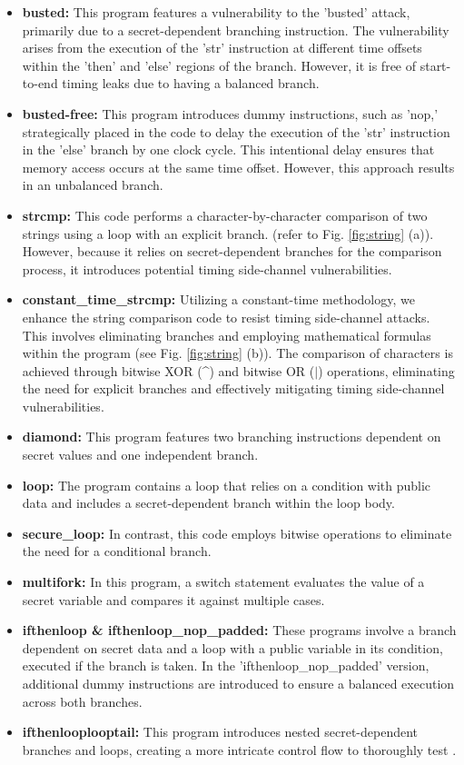 \begin{itemize}
%
    \item \textbf{busted:} This program features a vulnerability to the 'busted' attack, primarily due to a secret-dependent branching instruction. The vulnerability arises from the execution of the 'str' instruction at different time offsets within the 'then' and 'else' regions of the branch. However, it is free of start-to-end timing leaks due to having a balanced branch.
%
    \item \textbf{busted-free:} This program introduces dummy instructions, such as 'nop,' strategically placed in the code to delay the execution of the 'str' instruction in the 'else' branch by one clock cycle. This intentional delay ensures that memory access occurs at the same time offset. However, this approach results in an unbalanced branch.
%
    \item \textbf{strcmp:} This code performs a character-by-character comparison of two strings using a loop with an explicit branch. (refer to Fig. \ref{fig:string} (a)). However, because it relies on secret-dependent branches for the comparison process, it introduces potential timing side-channel vulnerabilities.
%
    \item \textbf{ constant\_time\_strcmp:} Utilizing a constant-time methodology, we enhance the string comparison code to resist timing side-channel attacks. This involves eliminating branches and employing mathematical formulas within the program (see Fig. \ref{fig:string} (b)). The comparison of characters is achieved through bitwise XOR (\textasciicircum) and bitwise OR ($|$) operations, eliminating the need for explicit branches and effectively mitigating timing side-channel vulnerabilities.
%
    \item \textbf{diamond:} This program features two branching instructions dependent on secret values and one independent branch.
%
    \item \textbf{loop:} The program contains a loop that relies on a condition with public data and includes a secret-dependent branch within the loop body. 
%    
    \item \textbf{secure\_loop:} In contrast, this code employs bitwise operations to eliminate the need for a conditional branch.
%    
    \item \textbf{multifork:} In this program, a switch statement evaluates the value of a secret variable and compares it against multiple cases. 
    
    \item \textbf{ifthenloop \& ifthenloop\_nop\_padded:} These programs
involve a branch dependent on secret data and a loop with a public variable
in its condition, executed if the branch is taken. In the
'ifthenloop\_nop\_padded' version, additional dummy instructions are
introduced to ensure a balanced execution across both branches.  
%    
    \item \textbf{ifthenlooplooptail:} This program introduces nested
secret-dependent branches and loops, creating a more intricate control flow
to thoroughly test \tool{}.
%
\end{itemize}


